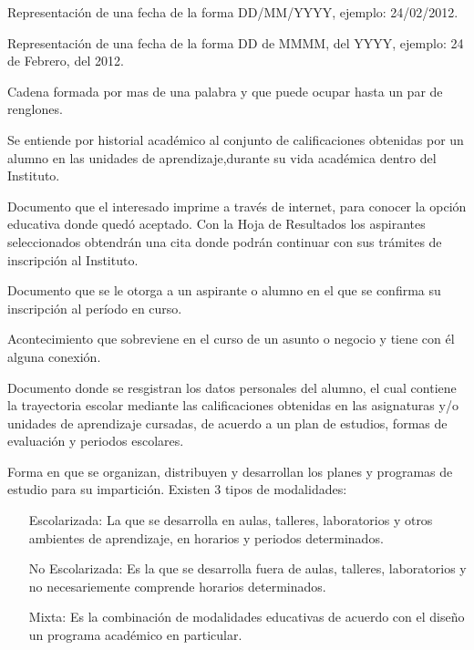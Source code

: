 \begin{bGlosario}
	 Representación de una fecha de la forma DD/MM/YYYY, ejemplo: 24/02/2012.
	
	 Representación de una fecha de la forma DD de MMMM, del YYYY, ejemplo: 24 de Febrero, del 2012.
	
	 Cadena formada por mas de una palabra y que puede ocupar hasta un par de renglones.
	
	 Se entiende por historial académico al conjunto de calificaciones obtenidas por un alumno en las unidades de aprendizaje,durante su vida académica dentro del Instituto.
	
	 Documento que el interesado imprime a través de internet, para conocer la opción educativa donde quedó aceptado. Con la Hoja de Resultados los aspirantes seleccionados obtendrán una cita donde podrán continuar con sus trámites de inscripción al Instituto. %
	
	 Documento que se le otorga a un aspirante o alumno en el que se confirma su inscripción al período en curso.
	
	Acontecimiento que sobreviene en el curso de un asunto o negocio y tiene con él alguna conexión.
	
	
	 Documento donde se resgistran los datos personales del alumno, el cual contiene la trayectoria escolar mediante las calificaciones obtenidas en las asignaturas y/o unidades de aprendizaje cursadas, de acuerdo a un plan de estudios, formas de evaluación y periodos escolares. %
	
	 Forma en que se organizan, distribuyen y desarrollan los planes y programas de estudio para su impartición. Existen 3 tipos de modalidades:
	\begin{itemize}
		\item [Escolarizada:] La que se desarrolla en aulas, talleres, laboratorios y otros ambientes de aprendizaje, en horarios y periodos determinados.
		\item [No Escolarizada:] Es la que se desarrolla fuera de aulas,
		talleres, laboratorios y no necesariemente comprende horarios determinados.
		\item [Mixta:] Es la combinación de modalidades educativas de
		acuerdo con el diseño un programa académico en particular.
	\end{itemize}
	

\end{bGlosario}
